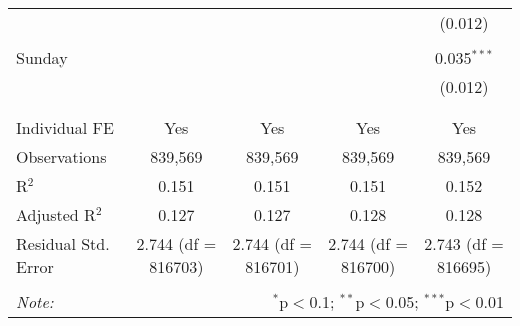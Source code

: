 \documentclass[
]{article}
\begin{document}
\begin{table}[!htbp]
{\begin{tabular}{@{\extracolsep{5pt}}lcccc}
  &  &  &  & (0.012) \\ 
  & & & & \\ 
 Sunday &  &  &  & 0.035$^{***}$ \\ 
  &  &  &  & (0.012) \\ 
  & & & & \\ 
\hline \\[-1.8ex] 
Individual FE & Yes & Yes & Yes & Yes \\ 
Observations & 839,569 & 839,569 & 839,569 & 839,569 \\ 
R$^{2}$ & 0.151 & 0.151 & 0.151 & 0.152 \\ 
Adjusted R$^{2}$ & 0.127 & 0.127 & 0.128 & 0.128 \\ 
Residual Std. Error & 2.744 (df = 816703) & 2.744 (df = 816701) & 2.744 (df = 816700) & 2.743 (df = 816695) \\ 
\hline 
\hline \\[-1.8ex] 
\textit{Note:}  & \multicolumn{4}{r}{$^{*}$p$<$0.1; $^{**}$p$<$0.05; $^{***}$p$<$0.01} \\ 
\end{tabular}
} 
\end{table} 
\newpage
\end{document}
